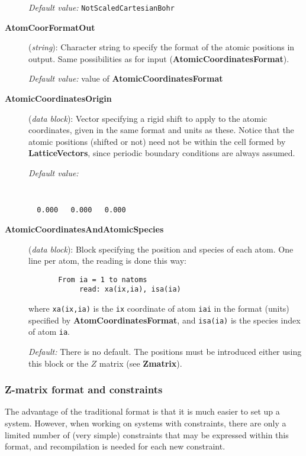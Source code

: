 \documentclass[11pt]{article}
\begin{document}
\begin{description}
{\it Default value:} {\tt NotScaledCartesianBohr}


\item[{\bf AtomCoorFormatOut}] ({\it string}):
Character string to specify the format of the atomic positions in output.
Same possibilities as for input ({\bf AtomicCoordinatesFormat}).

{\it Default value:} value of {\bf AtomicCoordinatesFormat}


\item[{\bf AtomicCoordinatesOrigin}] ({\it data block}):
Vector specifying a rigid shift to apply to the atomic coordinates,
given in the same format and units as these. Notice that the atomic
positions (shifted or not) need not be within the cell formed by
{\bf LatticeVectors}, since periodic boundary conditions are always
assumed.

{\it Default value:}
{\tt
\begin{verbatim}
  0.000   0.000   0.000
\end{verbatim}
}

\item[{\bf AtomicCoordinatesAndAtomicSpecies}] ({\it data block}):
Block specifying the position and species of each atom.
One line per atom, the reading is done this way:
\begin{verbatim}
       From ia = 1 to natoms
            read: xa(ix,ia), isa(ia)
\end{verbatim}
where {\tt xa(ix,ia)} is the {\tt ix} coordinate of atom
{\tt iai} in the format (units) specified by
{\bf AtomCoordinatesFormat}, and {\tt isa(ia)} is the species
index of atom {\tt ia}.

{\it Default:} There is no default. The positions must be introduced
either using this block or the $Z$ matrix (see {\bf Zmatrix}).

\end{description}
\subsubsection{Z-matrix format and constraints}
\label{sec:Zmatrix}

The advantage of the traditional format is that it is
much easier to set up a system. However, when working
on systems with constraints, there are only a limited
number of (very simple) constraints that may be expressed
within this format, and recompilation is needed for each
new constraint.
\end{document}
